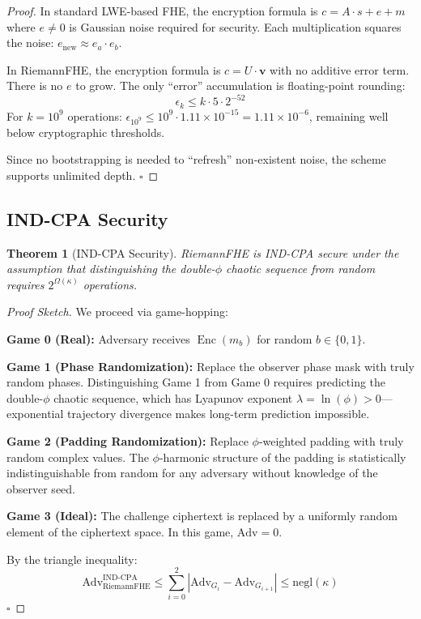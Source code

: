 \documentclass[11pt,a4paper]{article}
\newtheorem{theorem}{Theorem}[section]
\theoremstyle{remark}
\DeclareMathOperator{\Enc}{Enc}
\begin{document}
\begin{proof}
In standard LWE-based FHE, the encryption formula is $c = A \cdot s + e + m$ where $e \neq 0$ is Gaussian noise required for security. Each multiplication squares the noise: $e_{\text{new}} \approx e_a \cdot e_b$.

In RiemannFHE, the encryption formula is $c = U \cdot \mathbf{v}$ with no additive error term. There is no $e$ to grow. The only ``error'' accumulation is floating-point rounding:
\begin{equation}
    \epsilon_k \leq k \cdot 5 \cdot 2^{-52}
\end{equation}
For $k = 10^9$ operations: $\epsilon_{10^9} \leq 10^9 \cdot 1.11 \times 10^{-15} = 1.11 \times 10^{-6}$, remaining well below cryptographic thresholds.

Since no bootstrapping is needed to ``refresh'' non-existent noise, the scheme supports unlimited depth. \hfill $\square$
\end{proof}

\subsection{IND-CPA Security}

\begin{theorem}[IND-CPA Security]
RiemannFHE is IND-CPA secure under the assumption that distinguishing the double-$\phi$ chaotic sequence from random requires $2^{\Omega(\kappa)}$ operations.
\end{theorem}

\begin{proof}[Proof Sketch]
We proceed via game-hopping:

\textbf{Game 0 (Real):} Adversary receives $\Enc(m_b)$ for random $b \in \{0,1\}$.

\textbf{Game 1 (Phase Randomization):} Replace the observer phase mask with truly random phases. Distinguishing Game 1 from Game 0 requires predicting the double-$\phi$ chaotic sequence, which has Lyapunov exponent $\lambda = \ln(\phi) > 0$—exponential trajectory divergence makes long-term prediction impossible.

\textbf{Game 2 (Padding Randomization):} Replace $\phi$-weighted padding with truly random complex values. The $\phi$-harmonic structure of the padding is statistically indistinguishable from random for any adversary without knowledge of the observer seed.

\textbf{Game 3 (Ideal):} The challenge ciphertext is replaced by a uniformly random element of the ciphertext space. In this game, $\text{Adv} = 0$.

By the triangle inequality:
\begin{equation}
    \text{Adv}_{\text{RiemannFHE}}^{\text{IND-CPA}} \leq \sum_{i=0}^{2} |\text{Adv}_{G_i} - \text{Adv}_{G_{i+1}}| \leq \text{negl}(\kappa)
\end{equation}
\hfill $\square$
\end{proof}
\end{document}

